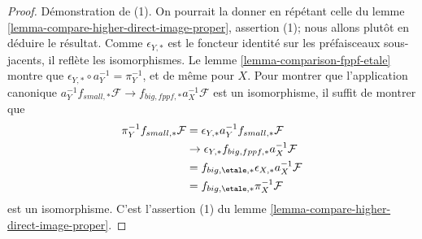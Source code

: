 \begin{proof}
Démonstration de (1). On pourrait la donner en répétant celle du lemme
\ref{lemma-compare-higher-direct-image-proper}, assertion (1); nous allons
plutôt en déduire le résultat. Comme $\epsilon_{Y, *}$ est le foncteur identité
sur les préfaisceaux sous-jacents, il reflète les isomorphismes. Le lemme
\ref{lemma-comparison-fppf-etale} montre que
$\epsilon_{Y, *} \circ a_Y^{-1} = \pi_Y^{-1}$, et de même pour $X$.
Pour montrer que l'application canonique
$a_Y^{-1}f_{small, *}\mathcal{F} \to f_{big, fppf, *}a_X^{-1}\mathcal{F}$
est un isomorphisme, il suffit de montrer que
\begin{align*}
\pi_Y^{-1}f_{small, *}\mathcal{F}
& =
\epsilon_{Y, *}a_Y^{-1}f_{small, *}\mathcal{F} \\
& \to 
\epsilon_{Y, *}f_{big, fppf, *}a_X^{-1}\mathcal{F} \\
& =
f_{big, \etale, *} \epsilon_{X, *}a_X^{-1}\mathcal{F} \\
& =
f_{big, \etale, *}\pi_X^{-1}\mathcal{F}
\end{align*}
est un isomorphisme. C'est l'assertion (1) du lemme
\ref{lemma-compare-higher-direct-image-proper}.


\end{proof}
